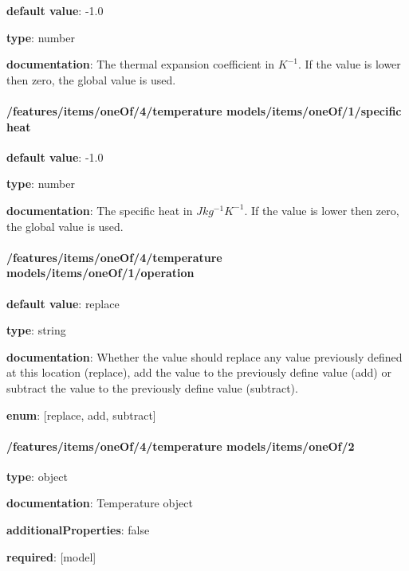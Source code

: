 \begin{itemized}
\item {\bf default value}: -1.0
\item {\bf type}: number
\item {\bf documentation}: The thermal expansion coefficient in $K^{-1}$. If the value is lower then zero, the global value is used.
\end{itemized}\paragraph{/features/items/oneOf/4/temperature models/items/oneOf/1/specific heat} \begin{itemized}
\item {\bf default value}: -1.0
\item {\bf type}: number
\item {\bf documentation}: The specific heat in $J kg^{-1} K^{-1}$. If the value is lower then zero, the global value is used.
\end{itemized}\paragraph{/features/items/oneOf/4/temperature models/items/oneOf/1/operation} \begin{itemized}
\item {\bf default value}: replace
\item {\bf type}: string
\item {\bf documentation}: Whether the value should replace any value previously defined at this location (replace), add the value to the previously define value (add) or subtract the value to the previously define value (subtract).
\item {\bf enum}: [replace, add, subtract]\end{itemized}\paragraph{/features/items/oneOf/4/temperature models/items/oneOf/2} \begin{itemized}
\item {\bf type}: object
\item {\bf documentation}: Temperature object
\item {\bf additionalProperties}: false
\item {\bf required}: [model]\end{itemized}
